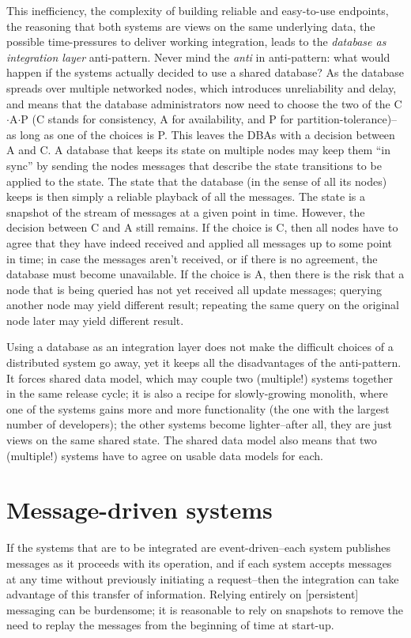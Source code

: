 This inefficiency, the complexity of building reliable and easy-to-use endpoints, the reasoning that both systems are views on the same underlying data, the possible time-pressures to deliver working integration, leads to the \emph{database as integration layer} anti-pattern\cite{eip}. Never mind the \emph{anti} in anti-pattern: what would happen if the systems actually decided to use a shared database? As the database spreads over multiple networked nodes, which introduces unreliability and delay, and means that the database administrators now need to choose the two of the C$\cdot$A$\cdot$P (C stands for consistency, A for availability, and P for partition-tolerance)--as long as one of the choices is P. This leaves the DBAs with a decision between A and C. A database that keeps its state on multiple nodes may keep them ``in sync'' by sending the nodes messages that describe the state transitions to be applied to the state. The state that the database (in the sense of all its nodes) keeps is then simply a reliable playback of all the messages. The state is a snapshot of the stream of messages at a given point in time. However, the decision between C and A still remains. If the choice is C, then all nodes have to agree that they have indeed received and applied all messages up to some point in time; in case the messages aren't received, or if there is no agreement, the database must become unavailable. If the choice is A, then there is the risk that a node that is being queried has not yet received all update messages; querying another node may yield different result; repeating the same query on the original node later may yield different result.

Using a database as an integration layer does not make the difficult choices of a distributed system go away, yet it keeps all the disadvantages of the anti-pattern. It forces shared data model, which may couple two (multiple!) systems together in the same release cycle; it is also a recipe for slowly-growing monolith, where one of the systems gains more and more functionality (the one with the largest number of developers); the other systems become lighter--after all, they are just views on the same shared state. The shared data model also means that two (multiple!) systems have to agree on usable data models for each.

\section{Message-driven systems}
If the systems that are to be integrated are event-driven--each system publishes messages as it proceeds with its operation, and if each system accepts messages at any time without previously initiating a request--then the integration can take advantage of this transfer of information. Relying entirely on [persistent] messaging can be burdensome; it is reasonable to rely on snapshots to remove the need to replay the messages from the beginning of time at start-up. 

